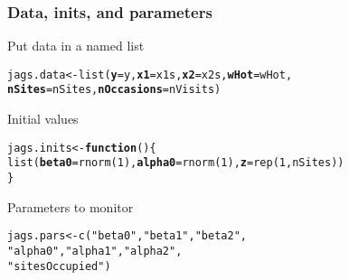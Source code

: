 \documentclass[color=usenames,dvipsnames]{beamer}\usepackage[]{graphicx}\usepackage[]{xcolor}
\makeatletter
\newcommand{\hlnum}[1]{\textcolor[rgb]{0.69,0.494,0}{#1}}%
\newcommand{\hlsng}[1]{\textcolor[rgb]{0.749,0.012,0.012}{#1}}%
\newcommand{\hldef}[1]{\textcolor[rgb]{0,0,0}{#1}}%
\newcommand{\hlkwa}[1]{\textcolor[rgb]{0,0,0}{\textbf{#1}}}%
\newcommand{\hlkwb}[1]{\textcolor[rgb]{0,0.341,0.682}{#1}}%
\newcommand{\hlkwc}[1]{\textcolor[rgb]{0,0,0}{\textbf{#1}}}%
\newcommand{\hlkwd}[1]{\textcolor[rgb]{0.004,0.004,0.506}{#1}}%
\newenvironment{kframe}{%
 \def\at@end@of@kframe{}%
 \ifinner\ifhmode%
  \def\at@end@of@kframe{\end{minipage}}%
  \begin{minipage}{\columnwidth}%
 \fi\fi%
 \def\FrameCommand##1{\hskip\@totalleftmargin \hskip-\fboxsep
 \colorbox{shadecolor}{##1}\hskip-\fboxsep
     \hskip-\linewidth \hskip-\@totalleftmargin \hskip\columnwidth}%
 \MakeFramed {\advance\hsize-\width
   \@totalleftmargin\z@ \linewidth\hsize
   \@setminipage}}%
 {\par\unskip\endMakeFramed%
 \at@end@of@kframe}
\newenvironment{knitrout}{}{} %
\makeatother
\begin{document}
\begin{frame}[fragile]
  \frametitle{Data, inits, and parameters}
  Put data in a named list
  \vspace{-12pt}
\begin{knitrout}\small
{}\color{fgcolor}\begin{kframe}
\begin{alltt}
\hldef{jags.data} \hlkwb{<-} \hlkwd{list}\hldef{(}\hlkwc{y}\hldef{=y,} \hlkwc{x1}\hldef{=x1s,} \hlkwc{x2}\hldef{=x2s,} \hlkwc{wHot}\hldef{=wHot,}
                  \hlkwc{nSites}\hldef{=nSites,} \hlkwc{nOccasions}\hldef{=nVisits)}
\end{alltt}
\end{kframe}
\end{knitrout}
\pause
\vfill
  Initial values
  \vspace{-12pt}
\begin{knitrout}\small
{}\color{fgcolor}\begin{kframe}
\begin{alltt}
\hldef{jags.inits} \hlkwb{<-} \hlkwa{function}\hldef{() \{}
    \hlkwd{list}\hldef{(}\hlkwc{beta0}\hldef{=}\hlkwd{rnorm}\hldef{(}\hlnum{1}\hldef{),} \hlkwc{alpha0}\hldef{=}\hlkwd{rnorm}\hldef{(}\hlnum{1}\hldef{),} \hlkwc{z}\hldef{=}\hlkwd{rep}\hldef{(}\hlnum{1}\hldef{, nSites))}
\hldef{\}}
\end{alltt}
\end{kframe}
\end{knitrout}
\pause
\vfill
  Parameters to monitor
  \vspace{-12pt}
\begin{knitrout}\small
{}\color{fgcolor}\begin{kframe}
\begin{alltt}
\hldef{jags.pars} \hlkwb{<-} \hlkwd{c}\hldef{(}\hlsng{"beta0"}\hldef{,} \hlsng{"beta1"}\hldef{,} \hlsng{"beta2"}\hldef{,}
               \hlsng{"alpha0"}\hldef{,} \hlsng{"alpha1"}\hldef{,} \hlsng{"alpha2"}\hldef{,}
               \hlsng{"sitesOccupied"}\hldef{)}
\end{alltt}
\end{kframe}
\end{knitrout}
\end{frame}
\end{document}
